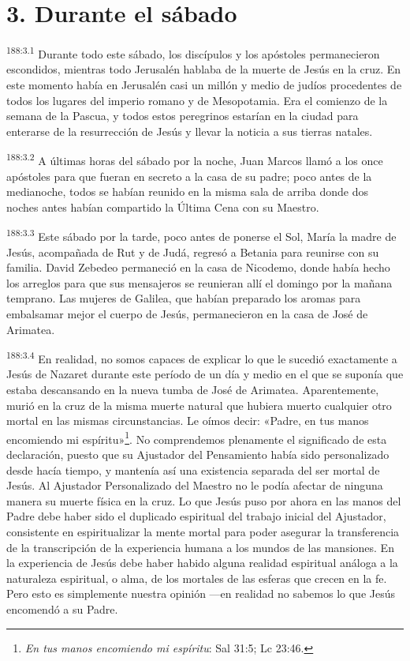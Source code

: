 \section*{3. Durante el sábado}
\par
\textsuperscript{188:3.1} Durante todo este sábado, los discípulos y los apóstoles permanecieron escondidos, mientras todo Jerusalén hablaba de la muerte de Jesús en la cruz. En este momento había en Jerusalén casi un millón y medio de judíos procedentes de todos los lugares del imperio romano y de Mesopotamia. Era el comienzo de la semana de la Pascua, y todos estos peregrinos estarían en la ciudad para enterarse de la resurrección de Jesús y llevar la noticia a sus tierras natales.

\par
\textsuperscript{188:3.2} A últimas horas del sábado por la noche, Juan Marcos llamó a los once apóstoles para que fueran en secreto a la casa de su padre; poco antes de la medianoche, todos se habían reunido en la misma sala de arriba donde dos noches antes habían compartido la Última Cena con su Maestro.

\par
\textsuperscript{188:3.3} Este sábado por la tarde, poco antes de ponerse el Sol, María la madre de Jesús, acompañada de Rut y de Judá, regresó a Betania para reunirse con su familia. David Zebedeo permaneció en la casa de Nicodemo, donde había hecho los arreglos para que sus mensajeros se reunieran allí el domingo por la mañana temprano. Las mujeres de Galilea, que habían preparado los aromas para embalsamar mejor el cuerpo de Jesús, permanecieron en la casa de José de Arimatea.

\par
\textsuperscript{188:3.4} En realidad, no somos capaces de explicar lo que le sucedió exactamente a Jesús de Nazaret durante este período de un día y medio en el que se suponía que estaba descansando en la nueva tumba de José de Arimatea. Aparentemente, murió en la cruz de la misma muerte natural que hubiera muerto cualquier otro mortal en las mismas circunstancias. Le oímos decir: «Padre, en tus manos encomiendo mi espíritu»\footnote{\textit{En tus manos encomiendo mi espíritu}: Sal 31:5; Lc 23:46.}. No comprendemos plenamente el significado de esta declaración, puesto que su Ajustador del Pensamiento había sido personalizado desde hacía tiempo, y mantenía así una existencia separada del ser mortal de Jesús. Al Ajustador Personalizado del Maestro no le podía afectar de ninguna manera su muerte física en la cruz. Lo que Jesús puso por ahora en las manos del Padre debe haber sido el duplicado espiritual del trabajo inicial del Ajustador, consistente en espiritualizar la mente mortal para poder asegurar la transferencia de la transcripción de la experiencia humana a los mundos de las mansiones. En la experiencia de Jesús debe haber habido alguna realidad espiritual análoga a la naturaleza espiritual, o alma, de los mortales de las esferas que crecen en la fe. Pero esto es simplemente nuestra opinión ---en realidad no sabemos lo que Jesús encomendó a su Padre.

